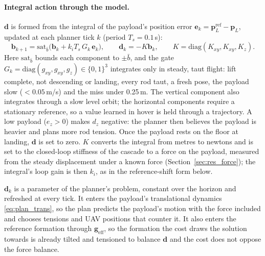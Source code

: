 \paragraph{Integral action through the model.} $\mathbf{d}$ is formed from the integral of the payload's
position error $\mathbf{e}_k = \mathbf{p}_L^{\mathrm{ref}} - \mathbf{p}_L$, updated at each planner tick
$k$ (period $T_s = 0.1$\,s):
\begin{equation}
    \mathbf{b}_{k+1} = \mathrm{sat}_{\bar{b}}\!\big(\mathbf{b}_k + k_i T_s\, G_k\, \mathbf{e}_k\big), \qquad
    \mathbf{d}_k = -K \mathbf{b}_k, \qquad K = \mathrm{diag}(K_{xy}, K_{xy}, K_z).
    \label{eq:lumped_int}
\end{equation}
Here $\mathrm{sat}_{\bar{b}}$ bounds each component to $\pm\bar{b}$, and the gate $G_k = \mathrm{diag}(g_{xy},
g_{xy}, g_z) \in \{0,1\}^3$ integrates only in steady, taut flight: lift complete, not descending or
landing, every rod taut, a fresh pose, the payload slow ($<0.05$\,m/s) and the miss under 0.25\,m. The
vertical component also integrates through a slow level orbit; the horizontal components require a
stationary reference, so a value learned in hover is held through a trajectory. A low payload ($e_z > 0$)
makes $d_z$ negative: the planner then believes the payload is heavier and plans more rod tension. Once
the payload rests on the floor at landing, $\mathbf{d}$ is set to zero. $K$ converts the integral from
metres to newtons and is set to the closed-loop stiffness of the cascade to a force on the payload,
measured from the steady displacement under a known force (Section~\ref{sec:res_force}); the integral's
loop gain is then $k_i$, as in the reference-shift form below.

$\mathbf{d}_k$ is a parameter of the planner's problem, constant over the horizon and refreshed at every
tick. It enters the payload's translational dynamics \eqref{eq:plan_trans}, so the plan predicts the
payload's motion with the force included and chooses tensions and UAV positions that counter it. It also
enters the reference formation through $\mathbf{g}_{\mathrm{eff}}$, so the formation the cost draws the
solution towards is already tilted and tensioned to balance $\mathbf{d}$ and the cost does not oppose the
force balance.

